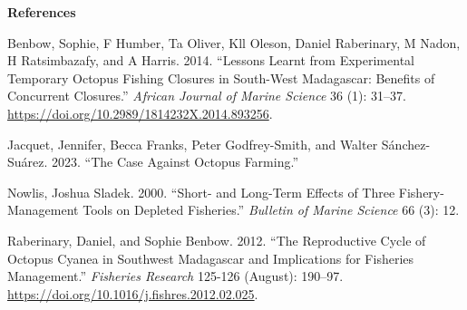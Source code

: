 \documentclass[
]{article}
\newlength{\cslhangindent}
\newlength{\cslentryspacingunit} %
\newenvironment{CSLReferences}[2] %
 {%
  \setlength{\parindent}{0pt}
  \ifodd #1
  \let\oldpar\par
  \def\par{\hangindent=\cslhangindent\oldpar}
  \fi
  \setlength{\parskip}{#2\cslentryspacingunit}
 }%
 {}
\begin{document}
\newpage

\textbf{References}

\hypertarget{refs}{}
\begin{CSLReferences}{1}{0}
\leavevmode{}%
Benbow, Sophie, F Humber, Ta Oliver, Kll Oleson, Daniel Raberinary, M Nadon, H Ratsimbazafy, and A Harris. 2014. {``Lessons Learnt from Experimental Temporary Octopus Fishing Closures in South-West {Madagascar}: Benefits of Concurrent Closures.''} \emph{African Journal of Marine Science} 36 (1): 31--37. \url{https://doi.org/10.2989/1814232X.2014.893256}.

\leavevmode{}%
Jacquet, Jennifer, Becca Franks, Peter Godfrey-Smith, and Walter Sánchez-Suárez. 2023. {``The {Case} {Against} {Octopus} {Farming}.''}

\leavevmode{}%
Nowlis, Joshua Sladek. 2000. {``Short- and Long-Term Effects of Three Fishery-Management Tools on Depleted Fisheries.''} \emph{Bulletin of Marine Science} 66 (3): 12.

\leavevmode{}%
Raberinary, Daniel, and Sophie Benbow. 2012. {``The Reproductive Cycle of {Octopus} Cyanea in Southwest {Madagascar} and Implications for Fisheries Management.''} \emph{Fisheries Research} 125-126 (August): 190--97. \url{https://doi.org/10.1016/j.fishres.2012.02.025}.

\end{CSLReferences}
\end{document}
